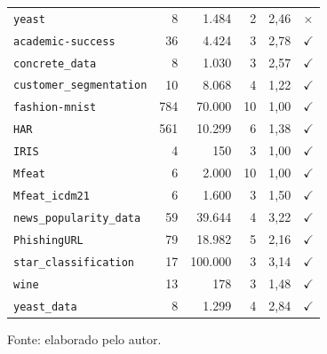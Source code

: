 \begin{longtable}{lrrrrc}
    \texttt{yeast} & 8 & 1.484 & 2 & 2,46 & $\times$ \\
    \texttt{academic-success} & 36 & 4.424 & 3 & 2,78 & $\checkmark$ \\
    \texttt{concrete\_data} & 8 & 1.030 & 3 & 2,57 & $\checkmark$ \\
    \texttt{customer\_segmentation} & 10 & 8.068 & 4 & 1,22 & $\checkmark$ \\
    \texttt{fashion-mnist} & 784 & 70.000 & 10 & 1,00 & $\checkmark$ \\
    \texttt{HAR} & 561 & 10.299 & 6 & 1,38 & $\checkmark$ \\
    \texttt{IRIS} & 4 & 150 & 3 & 1,00 & $\checkmark$ \\
    \texttt{Mfeat} & 6 & 2.000 & 10 & 1,00 & $\checkmark$ \\
    \texttt{Mfeat\_icdm21} & 6 & 1.600 & 3 & 1,50 & $\checkmark$ \\
    \texttt{news\_popularity\_data} & 59 & 39.644 & 4 & 3,22 & $\checkmark$ \\
    \texttt{PhishingURL} & 79 & 18.982 & 5 & 2,16 & $\checkmark$ \\
    \texttt{star\_classification} & 17 & 100.000 & 3 & 3,14 & $\checkmark$ \\
    \texttt{wine} & 13 & 178 & 3 & 1,48 & $\checkmark$ \\
    \texttt{yeast\_data} & 8 & 1.299 & 4 & 2,84 & $\checkmark$ \\
    \hline
\end{longtable}

{\footnotesize Fonte: elaborado pelo autor.}
\normalsize
